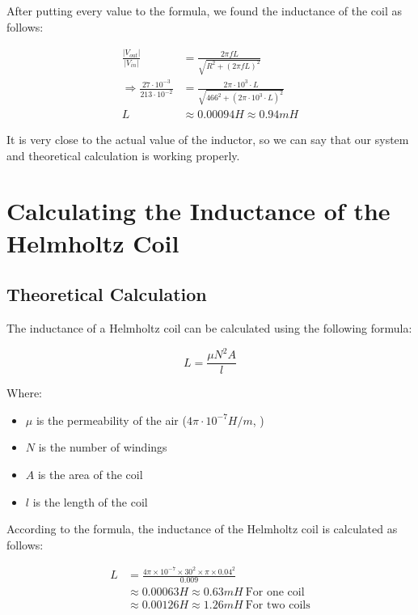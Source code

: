 After putting every value to the formula, we found the inductance of the coil as follows:

\begin{align*}
    \frac{|V_{out}|}{|V_{in}|} &= \frac{2\pi f L}{\sqrt{R^2 + (2\pi f L)^2}} \\
    \Rightarrow \frac{27 \cdot 10^{-3}}{213 \cdot 10^{-2}} &= \frac{2\pi \cdot 10^3 \cdot L}{\sqrt{466^2 + (2\pi \cdot 10^3 \cdot L)^2}} \\
    L &\approx 0.00094H \approx 0.94mH
\end{align*}

It is very close to the actual value of the inductor, so we can say that our system and theoretical calculation is working properly.

\section{Calculating the Inductance of the Helmholtz Coil}

\subsection{Theoretical Calculation}

The inductance of a Helmholtz coil can be calculated using the following formula:

\[ L = \frac{\mu N^2A}{l} \]

\noindent Where:
\begin{itemize}
    \item \( \mu \) is the permeability of the air ($4\pi \cdot 10^{-7}H/m$, \cite{air_permeability_saini})
    \item \( N \) is the number of windings
    \item \( A \) is the area of the coil
    \item \( l \) is the length of the coil
\end{itemize}

According to the formula, the inductance of the Helmholtz coil is calculated as follows:

\begin{align*}
    L &= \frac{4\pi \times 10^{-7} \times 30^2 \times \pi \times 0.04^2}{0.009} \\
    &\approx 0.00063H \approx 0.63mH~\text{For one coil} \\
    &\approx 0.00126H \approx 1.26mH~\text{For two coils}
\end{align*}

